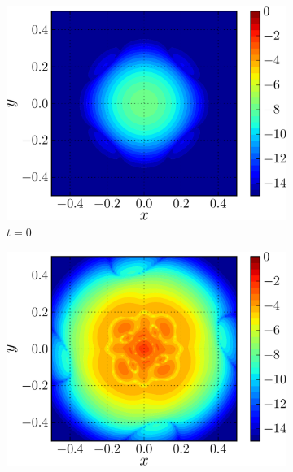 %	
		\begin{figure}[!t]
	  \centering
	  \begin{subfigure}[b]{0.45\textwidth}
	          \includegraphics[width=\textwidth]{figures/lagrangian/lambOseen_intialError_wRel-crop.png}
	          \caption{$t=0$}
	          \label{fig:lambOseen_convection_vorticityErrorContours_initial}
	  \end{subfigure}%
	  \qquad %
	  \begin{subfigure}[b]{0.45\textwidth}
	          \includegraphics[width=\textwidth]{figures/lagrangian/lambOseen_finalErrorEvolution_wRel-crop.png}

\end{subfigure}
\end{figure}
